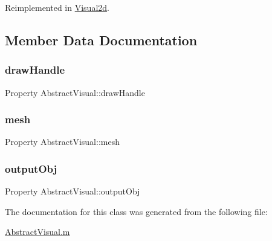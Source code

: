 Reimplemented in \hyperlink{class_visual2d_af12862a4c3432298ca629a45921d2a2e}{Visual2d}.



\subsection{Member Data Documentation}
\mbox{\label{class_abstract_visual_aa4f580f1e4aa83a1e719dff9287adf1c}} 
\subsubsection{\texorpdfstring{draw\+Handle}{drawHandle}}
{\footnotesize\ttfamily Property Abstract\+Visual\+::draw\+Handle\hspace{0.3cm}{\ttfamily [protected]}}

\mbox{\label{class_abstract_visual_a8ab1d2da1797dd6cd72205c673336366}} 
\subsubsection{\texorpdfstring{mesh}{mesh}}
{\footnotesize\ttfamily Property Abstract\+Visual\+::mesh\hspace{0.3cm}{\ttfamily [protected]}}

\mbox{\label{class_abstract_visual_a640d3d439c55d1229b740fd6cdf14309}} 
\subsubsection{\texorpdfstring{output\+Obj}{outputObj}}
{\footnotesize\ttfamily Property Abstract\+Visual\+::output\+Obj\hspace{0.3cm}{\ttfamily [protected]}}



The documentation for this class was generated from the following file\+:\begin{DoxyCompactItemize}
\item 
\hyperlink{_abstract_visual_8m}{Abstract\+Visual.\+m}\end{DoxyCompactItemize}

